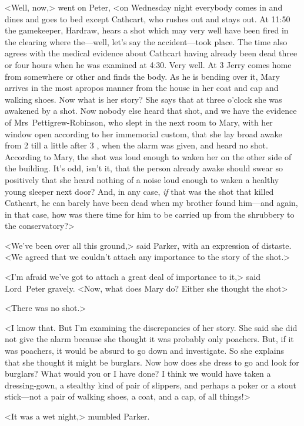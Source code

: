 <Well, now,> went on Peter, <on Wednesday night everybody comes in and dines and goes to bed except Cathcart, who rushes out and stays out. At 11:50 the gamekeeper, Hardraw, hears a shot which may very well have been fired in the clearing where the—well, let's say the accident—took place. The time also agrees with the medical evidence about Cathcart having already been dead three or four hours when he was examined at 4:30. Very well. At 3  Jerry comes home from somewhere or other and finds the body. As he is bending over it, Mary arrives in the most apropos manner from the house in her coat and cap and walking shoes. Now what is her story? She says that at three o'clock she was awakened by a shot. Now nobody else heard that shot, and we have the evidence of Mrs~Pettigrew-Robinson, who slept in the next room to Mary, with her window open according to her immemorial custom, that she lay broad awake from 2  till a little after 3 , when the alarm was given, and heard no shot. According to Mary, the shot was loud enough to waken her on the other side of the building. It's odd, isn't it, that the person already awake should swear so positively that she heard nothing of a noise loud enough to waken a healthy young sleeper next door? And, in any case, \emph{if} that was the shot that killed Cathcart, he can barely have been dead when my brother found him—and again, in that case, how was there time for him to be carried up from the shrubbery to the conservatory?>

<We've been over all this ground,> said Parker, with an expression of distaste. <We agreed that we couldn't attach any importance to the story of the shot.>

<I'm afraid we've got to attach a great deal of importance to it,> said Lord~Peter gravely. <Now, what does Mary do? Either she thought the shot\longdash>

<There was no shot.>

<I know that. But I'm examining the discrepancies of her story. She said she did not give the alarm because she thought it was probably only poachers. But, if it was poachers, it would be absurd to go down and investigate. So she explains that she thought it might be burglars.  Now how does she dress to go and look for burglars? What would you or I have done? I think we would have taken a dressing-gown, a stealthy kind of pair of slippers, and perhaps a poker or a stout stick—not a pair of walking shoes, a coat, and a cap, of all things!>

<It was a wet night,> mumbled Parker.

